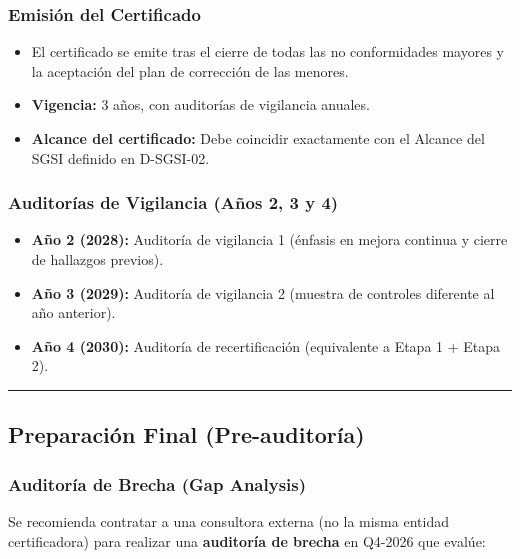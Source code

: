\documentclass[10pt,letterpaper]{article}
\begin{document}
\subsubsection{Emisión del
Certificado}\label{emisiuxf3n-del-certificado}

\begin{itemize}
\tightlist
\item
  El certificado se emite tras el cierre de todas las no conformidades
  mayores y la aceptación del plan de corrección de las menores.
\item
  \textbf{Vigencia:} 3 años, con auditorías de vigilancia anuales.
\item
  \textbf{Alcance del certificado:} Debe coincidir exactamente con el
  Alcance del SGSI definido en D-SGSI-02.
\end{itemize}

\subsubsection{Auditorías de Vigilancia (Años 2, 3 y
4)}\label{auditoruxedas-de-vigilancia-auxf1os-2-3-y-4}

\begin{itemize}
\tightlist
\item
  \textbf{Año 2 (2028):} Auditoría de vigilancia 1 (énfasis en mejora
  continua y cierre de hallazgos previos).
\item
  \textbf{Año 3 (2029):} Auditoría de vigilancia 2 (muestra de controles
  diferente al año anterior).
\item
  \textbf{Año 4 (2030):} Auditoría de recertificación (equivalente a
  Etapa 1 + Etapa 2).
\end{itemize}

\begin{center}\rule{0.5\linewidth}{0.5pt}\end{center}

\subsection{Preparación Final
(Pre-auditoría)}\label{preparaciuxf3n-final-pre-auditoruxeda}

\subsubsection{Auditoría de Brecha (Gap
Analysis)}\label{auditoruxeda-de-brecha-gap-analysis}

Se recomienda contratar a una consultora externa (no la misma entidad
certificadora) para realizar una \textbf{auditoría de brecha} en Q4-2026
que evalúe:
\end{document}
